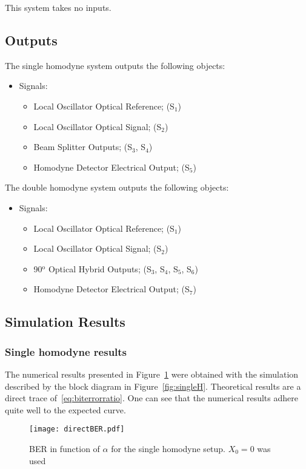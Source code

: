 This system takes no inputs.
%
\subsection*{Outputs}

The single homodyne system outputs the following objects:
\begin{itemize}
\item Signals:
\begin{itemize}
\item Local Oscillator Optical Reference; (S$_{1}$)
\item Local Oscillator Optical Signal; (S$_{2}$)
\item Beam Splitter Outputs; (S$_{3}$, S$_{4}$)
\item Homodyne Detector Electrical Output; (S$_{5}$)
\end{itemize}
\end{itemize}
\par
The double homodyne system outputs the following objects:
\begin{itemize}
\item Signals:
\begin{itemize}
\item Local Oscillator Optical Reference; (S$_{1}$)
\item Local Oscillator Optical Signal; (S$_{2}$)
\item 90$^\text{o}$ Optical Hybrid Outputs; (S$_{3}$, S$_{4}$, S$_{5}$, S$_{6}$)
\item Homodyne Detector Electrical Output; (S$_{7}$)
\end{itemize}
\end{itemize}		

\subsection*{Simulation Results}
\subsubsection*{Single homodyne results}\label{subsec:SHresults}

The numerical results presented in Figure~\ref{fig:directber} were obtained with the simulation described by the block diagram in Figure~\ref{fig:singleH}. Theoretical results are a direct trace of~\eqref{eq:biterrorratio}. One can see that the numerical results adhere quite well to the expected curve.

\begin{figure}[h]
\centering
\texttt{[image: directBER.pdf]}
\caption{BER in function of $\alpha$ for the single homodyne setup. $X_0=0$ was used}
\label{fig:directber}
\end{figure}

